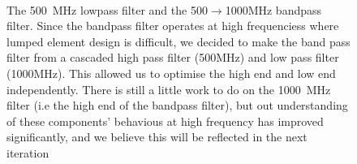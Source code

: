 

 
\begin{figure}
 \centering
{}\\
\label{fig:LowFrequencyFilters} 
\caption{The 500~MHz lowpass filter and the 500$\rightarrow$1000MHz bandpass filter. Since the bandpass filter operates at high frequenciess where lumped element design is difficult, we decided to make the band pass filter from a cascaded high pass filter (500MHz) and low pass filter (1000MHz). This allowed us to optimise the high end and low end independently. There is still a little work to do on the 1000~MHz filter (i.e the high end of the bandpass filter), but out understanding of these components' behavious at high frequency has improved significantly, and we believe this will be reflected in the next iteration}
\end{figure}